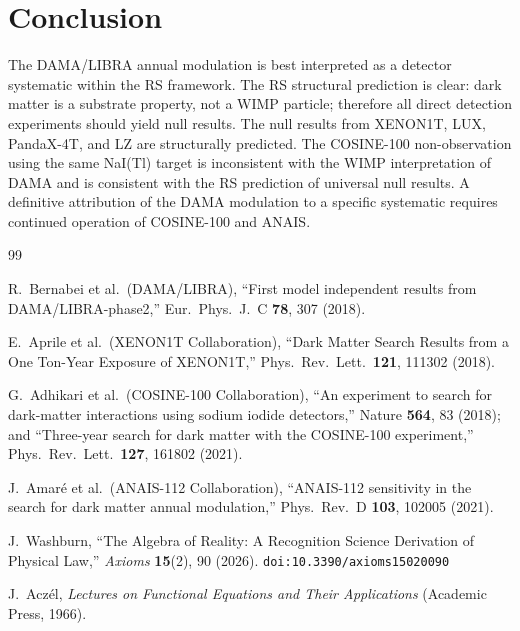 \documentclass[12pt,a4paper]{article}
\theoremstyle{definition}
\theoremstyle{remark}
\begin{document}
\section{Conclusion}
\label{sec:conclusion}

The DAMA/LIBRA annual modulation is best interpreted as a detector
systematic within the RS framework.  The RS structural prediction is
clear: dark matter is a substrate property, not a WIMP particle;
therefore all direct detection experiments should yield null results.
The null results from XENON1T, LUX, PandaX-4T, and LZ are
structurally predicted.  The COSINE-100 non-observation using the
same NaI(Tl) target is inconsistent with the WIMP interpretation of
DAMA and is consistent with the RS prediction of universal null results.
A definitive attribution of the DAMA modulation to a specific
systematic requires continued operation of COSINE-100 and ANAIS.

\begin{thebibliography}{99}

R.~Bernabei et al.\ (DAMA/LIBRA),
``First model independent results from DAMA/LIBRA-phase2,''
Eur.\ Phys.\ J.\ C \textbf{78}, 307 (2018).

E.~Aprile et al.\ (XENON1T Collaboration),
``Dark Matter Search Results from a One Ton-Year Exposure of XENON1T,''
Phys.\ Rev.\ Lett.\ \textbf{121}, 111302 (2018).

G.~Adhikari et al.\ (COSINE-100 Collaboration),
``An experiment to search for dark-matter interactions using
sodium iodide detectors,''
Nature \textbf{564}, 83 (2018); and
``Three-year search for dark matter with the COSINE-100 experiment,''
Phys.\ Rev.\ Lett.\ \textbf{127}, 161802 (2021).

J.~Amar\'e et al.\ (ANAIS-112 Collaboration),
``ANAIS-112 sensitivity in the search for dark matter annual modulation,''
Phys.\ Rev.\ D \textbf{103}, 102005 (2021).

J.~Washburn, ``The Algebra of Reality: A Recognition Science Derivation
of Physical Law,'' \emph{Axioms} \textbf{15}(2), 90 (2026).
\texttt{doi:10.3390/axioms15020090}

J.~Acz\'el, \emph{Lectures on Functional Equations and Their
Applications} (Academic Press, 1966).

\end{thebibliography}
\end{document}
